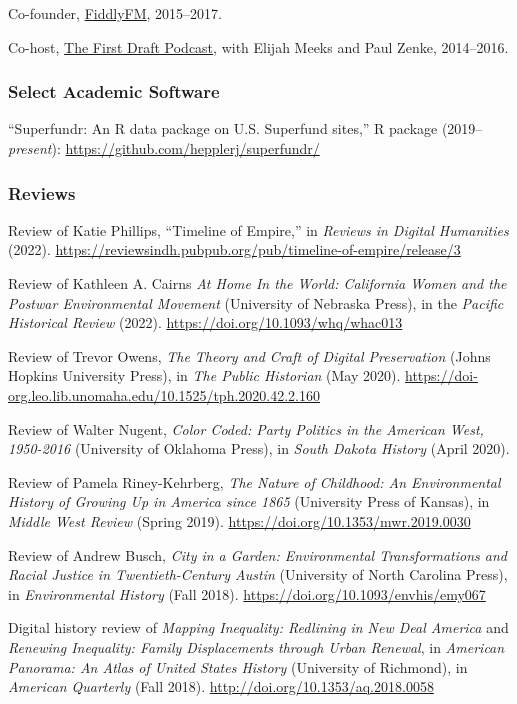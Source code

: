 Co-founder, \href{http://fiddly.fm}{FiddlyFM}, 2015--2017.

Co-host, \href{http://www.fiddly.fm/firstdraft/}{The First Draft
Podcast}, with Elijah Meeks and Paul Zenke, 2014--2016.

\hypertarget{select-academic-software}{%
\subsubsection{Select Academic
Software}\label{select-academic-software}}

``Superfundr: An R data package on U.S. Superfund sites,'' R package
(2019--\emph{present}): \url{https://github.com/hepplerj/superfundr/}

\hypertarget{reviews}{%
\subsubsection{Reviews}\label{reviews}}

Review of Katie Phillips, ``Timeline of Empire,'' in \emph{Reviews in
Digital Humanities} (2022).
\url{https://reviewsindh.pubpub.org/pub/timeline-of-empire/release/3}

Review of Kathleen A. Cairns \emph{At Home In the World: California
Women and the Postwar Environmental Movement} (University of Nebraska
Press), in the \emph{Pacific Historical Review} (2022).
\url{https://doi.org/10.1093/whq/whac013}

Review of Trevor Owens, \emph{The Theory and Craft of Digital
Preservation} (Johns Hopkins University Press), in \emph{The Public
Historian} (May 2020).
\url{https://doi-org.leo.lib.unomaha.edu/10.1525/tph.2020.42.2.160}

Review of Walter Nugent, \emph{Color Coded: Party Politics in the
American West, 1950-2016} (University of Oklahoma Press), in \emph{South
Dakota History} (April 2020).

Review of Pamela Riney-Kehrberg, \emph{The Nature of Childhood: An
Environmental History of Growing Up in America since 1865} (University
Press of Kansas), in \emph{Middle West Review} (Spring 2019).
\url{https://doi.org/10.1353/mwr.2019.0030}

Review of Andrew Busch, \emph{City in a Garden: Environmental
Transformations and Racial Justice in Twentieth-Century Austin}
(University of North Carolina Press), in \emph{Environmental History}
(Fall 2018). \url{https://doi.org/10.1093/envhis/emy067}

Digital history review of \emph{Mapping Inequality: Redlining in New
Deal America} and \emph{Renewing Inequality: Family Displacements
through Urban Renewal}, in \emph{American Panorama: An Atlas of United
States History} (University of Richmond), in \emph{American Quarterly}
(Fall 2018). \url{http://doi.org/10.1353/aq.2018.0058}

